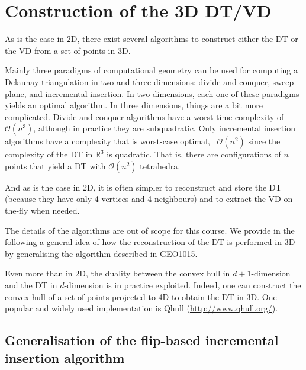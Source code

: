 %
\section[Construction of 3D DT/VD]{Construction of the 3D DT/VD}

As is the case in 2D, there exist several algorithms to construct either the DT or the VD from a set of points in 3D.

%

Mainly three paradigms of computational geometry can be used for computing a Delaunay triangulation in two and three dimensions:  divide-and-conquer, sweep plane, and incremental insertion.
In two dimensions, each one of these paradigms yields an optimal algorithm.
In three dimensions, things are a bit more complicated.
Divide-and-conquer algorithms have a worst time complexity of $\mathcal{O}(n^3)$, although in practice they are subquadratic.
Only incremental insertion algorithms have a complexity that is worst-case optimal, \ie\ $\mathcal{O}(n^2)$ since the complexity of the DT in $\mathbb{R}^3$ is quadratic.
That is, there are configurations of $n$ points that yield a DT with $\mathcal{O}(n^2)$ tetrahedra.

%

And as is the case in 2D, it is often simpler to reconstruct and store the DT (because they have only 4 vertices and 4 neighbours) and to extract the VD on-the-fly when needed.

%

The details of the algorithms are out of scope for this course.
We provide in the following a general idea of how the reconstruction of the DT is performed in 3D by generalising the algorithm described in GEO1015.

\begin{kaobox}[frametitle=\faCog\ How does it work in practice?]
  Even more than in 2D, the duality between the convex hull in $d+1$-dimension and the DT in $d$-dimension is in practice exploited.
  Indeed, one can construct the convex hull of a set of points projected to 4D to obtain the DT in 3D.
  One popular and widely used implementation is Qhull (\url{http://www.qhull.org/}).
\end{kaobox}


\subsection{Generalisation of the flip-based incremental insertion algorithm}

